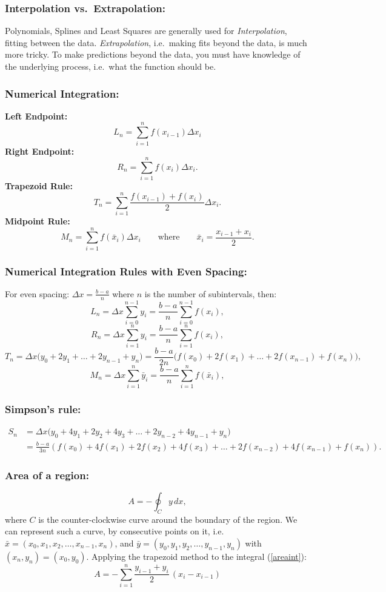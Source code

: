 \subsubsection*{Interpolation vs.\ Extrapolation:}
Polynomials, Splines and Least Squares are generally used
for {\em Interpolation}, fitting between the data. {\em Extrapolation},
i.e.\ making fits beyond the data, is much more tricky.
To make predictions beyond the data,
you must have knowledge
of the underlying process, i.e.\ what the function should be.

\subsubsection*{Numerical Integration:}
{\bf Left Endpoint:}
$$
   L_n = \sum_{i=1}^n f(x_{i-1}) \Delta x_i
$$
{\bf Right Endpoint:}
$$
  R_n = \sum_{i=1}^n f(x_i) \Delta x_i .
$$
{\bf Trapezoid Rule:}
$$
T_n = \sum_{i=1}^n \frac{f(x_{i-1}) + f(x_i)}{2} \Delta x_i .
$$
{\bf Midpoint Rule:}
$$
   M_n = \sum_{i=1}^n f(\bar{x}_i) \Delta x_i
\qquad
\textrm{where}
\qquad
        \bar{x}_i = \frac{ x_{i-1} + x_i}{2}.
$$

\subsubsection*{Numerical Integration Rules with Even Spacing:}
For even spacing: $ \Delta x  = \frac{b-a}{n}$
where $n$ is the number of subintervals, then:
$$
   L_n  = \Delta x \sum_{i=0}^{n-1} y_i = \frac{b-a}{n} \sum_{i=0}^{n-1} f(x_i),
$$
$$
   R_n = \Delta x \sum_{i=1}^{n} y_i = \frac{b-a}{n} \sum_{i=1}^n f(x_i),
$$
$$
T_n = \Delta x \bigl( y_0 + 2y_1 + \ldots + 2y_{n-1} + y_n \bigr)
     = \frac{b-a}{2n} \bigl( f(x_0) + 2f(x_1) +
                         \ldots + 2f(x_{n-1}) + f(x_n) \bigr),
$$
$$
   M_n = \Delta x \sum_{i=1}^{n} \bar{y}_i = \frac{b-a}{n} \sum_{i=1}^{n} f(\bar{x}_i),
$$
\subsubsection*{Simpson's rule:}
\begin{align*}
S_n &= \Delta x \bigl( y_0 + 4y_1 + 2y_2 + 4y_3 + \ldots + 2y_{n-2} + 4y_{n-1} + y_n \bigr)\\
    & =  \frac{b-a}{3n} \left( f(x_0) + 4f(x_1) + 2f(x_2) + 4f(x_3) +
            \ldots + 2f(x_{n-2}) + 4f(x_{n-1}) + f(x_n) \right) .
\end{align*}



\subsubsection*{Area of a region:}
\begin{equation*}
   A = - \oint_{C} y \, dx,
\end{equation*}
where $C$ is the counter-clockwise curve around the boundary of the region.
We can represent such a curve, by consecutive points on it, i.e.~
$\bar{x} = (x_0, x_1, x_2, \ldots, x_{n-1}, x_n)$, and
$\bar{y} = (y_0, y_1, y_2, \ldots, y_{n-1}, y_n)$ with $(x_n,y_n) = (x_0,y_0)$.
Applying the trapezoid method to the integral (\ref{areaint}):
$$
    A = - \sum_{i=1}^n \frac{y_{i-1} + y_i}{2} \, (x_i -x_{i-1})
$$

